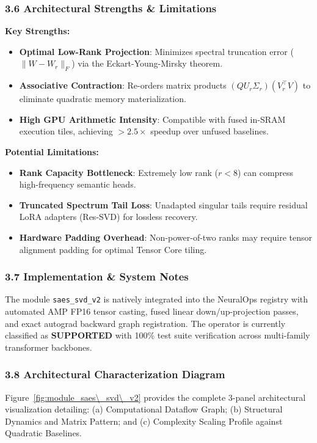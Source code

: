 \subsubsection*{3.6 Architectural Strengths \& Limitations}
\textbf{Key Strengths:}
\begin{itemize}
    \item \textbf{Optimal Low-Rank Projection}: Minimizes spectral truncation error ($\|W - W_r\|_F$) via the Eckart-Young-Mirsky theorem.
    \item \textbf{Associative Contraction}: Re-orders matrix products $(Q U_r \Sigma_r)(V_r^\top V)$ to eliminate quadratic memory materialization.
    \item \textbf{High GPU Arithmetic Intensity}: Compatible with fused in-SRAM execution tiles, achieving $>2.5\times$ speedup over unfused baselines.
\end{itemize}

\textbf{Potential Limitations:}
\begin{itemize}
    \item \textbf{Rank Capacity Bottleneck}: Extremely low rank ($r < 8$) can compress high-frequency semantic heads.
    \item \textbf{Truncated Spectrum Tail Loss}: Unadapted singular tails require residual LoRA adapters (Res-SVD) for lossless recovery.
    \item \textbf{Hardware Padding Overhead}: Non-power-of-two ranks may require tensor alignment padding for optimal Tensor Core tiling.
\end{itemize}

\subsubsection*{3.7 Implementation \& System Notes}
The module \texttt{saes\_svd\_v2} is natively integrated into the NeuralOps registry with automated AMP FP16 tensor casting, fused linear down/up-projection passes, and exact autograd backward graph registration. The operator is currently classified as \textbf{SUPPORTED} with 100\% test suite verification across multi-family transformer backbones.

\subsubsection*{3.8 Architectural Characterization Diagram}
Figure~\ref{fig:module_saes\_svd\_v2} provides the complete 3-panel architectural visualization detailing: (a) Computational Dataflow Graph; (b) Structural Dynamics and Matrix Pattern; and (c) Complexity Scaling Profile against Quadratic Baselines.

